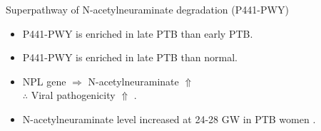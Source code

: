 \documentclass{beamer}
\begin{document}
\begin{frame}[allowframebreaks]
        \begin{block}{Superpathway of N-acetylneuraminate degradation (P441-PWY)}
            \begin{itemize}
                \item P441-PWY is enriched in late PTB than early PTB.
                \item P441-PWY is enriched in late PTB than normal.
                \item NPL gene $\Rightarrow$ N-acetylneuraminate $\Uparrow$ \\
                    $\therefore$ Viral pathogenicity $\Uparrow$ \cite{P441-PWY-2}.
                \item N-acetylneuraminate level increased at 24-28 GW in PTB women \cite{P441-PWY-1}.
            \end{itemize}
        \end{block}
    \end{frame}
\end{document}
